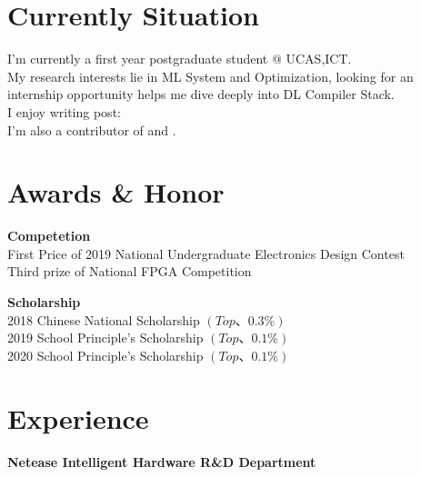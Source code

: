 \documentclass[a4paper,10pt]{article}
\begin{document}
\begin{adjustbox}{valign=t}
\begin{minipage}{0.6\textwidth} %
\section*{Currently Situation}
\begin{description}
	\raggedright
	\item I'm currently a first year postgraduate student @ UCAS,ICT.\\
	My research interests lie in ML System and Optimization, looking for an internship opportunity helps me dive deeply into DL Compiler Stack. \\
	I enjoy writing post: \\
	I'm also a contributor of  and .

\end{description}

\section*{Awards \& Honor}
\begin{description}
\raggedright
\item [] \textbf{Competetion} \\
	First Price of 2019 National Undergraduate Electronics Design Contest \\
	Third prize of National FPGA Competition \\
	\item [] \textbf{Scholarship} \\
	2018 Chinese National Scholarship $\left( Top 、 0.3 \% \right)$ \\
	2019 School Principle's Scholarship $\left( Top 、 0.1 \% \right)$ \\
	2020 School Principle's Scholarship $\left( Top 、 0.1 \% \right)$


\end{description}

\section*{Experience}
\begin{description}
\raggedright
\item[\normalfont \textcolor{ColorOne}{Sep. 2021 - Oct. 2021.}] 
	\textbf{Netease Intelligent Hardware R\&D Department}\\ \medskip
	

\end{description}
\end{minipage}
\end{adjustbox}
\end{document}

